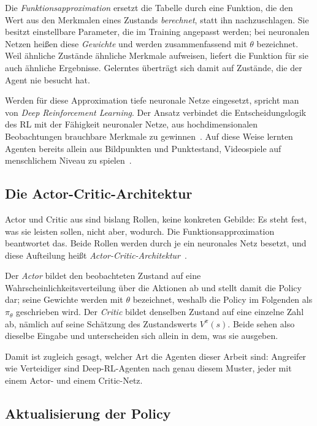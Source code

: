 Die \emph{Funktionsapproximation} ersetzt die Tabelle durch eine Funktion, die
den Wert aus den Merkmalen eines Zustands \emph{berechnet}, statt ihn
nachzuschlagen. Sie besitzt einstellbare Parameter, die im Training angepasst
werden; bei neuronalen Netzen heißen diese \emph{Gewichte} und werden
zusammenfassend mit $\theta$ bezeichnet. Weil ähnliche Zustände ähnliche
Merkmale aufweisen, liefert die Funktion für sie auch ähnliche Ergebnisse.
Gelerntes überträgt sich damit auf Zustände, die der Agent nie besucht hat.

Werden für diese Approximation tiefe neuronale Netze eingesetzt, spricht man von
\emph{Deep Reinforcement Learning}. Der Ansatz verbindet die Entscheidungslogik
des \ac{RL} mit der Fähigkeit neuronaler Netze, aus hochdimensionalen
Beobachtungen brauchbare Merkmale zu gewinnen~\cite[Teil~II]{suttonbarto2018}.
Auf diese Weise lernten Agenten bereits allein aus Bildpunkten und Punktestand,
Videospiele auf menschlichem Niveau zu spielen~\cite[S.~529]{mnih2015dqn}.

\subsection{Die Actor-Critic-Architektur}
\label{sec:ac-architektur}

Actor und Critic aus  sind bislang Rollen, keine
konkreten Gebilde: Es steht fest, was sie leisten sollen, nicht aber, wodurch.
Die Funktionsapproximation beantwortet das. Beide Rollen werden durch je ein
neuronales Netz besetzt, und diese Aufteilung heißt
\emph{Actor-Critic-Architektur}~\cite[Abschn.~13.5]{suttonbarto2018}.

Der \emph{Actor} bildet den beobachteten Zustand auf eine
Wahrscheinlichkeitsverteilung über die Aktionen ab und stellt damit die Policy
dar; seine Gewichte werden mit $\theta$ bezeichnet, weshalb die Policy im
Folgenden als $\pi_{\theta}$ geschrieben wird. Der \emph{Critic} bildet
denselben Zustand auf eine einzelne Zahl ab, nämlich auf seine Schätzung des
Zustandswerts $V^{\pi}(s)$. Beide sehen also dieselbe Eingabe und
unterscheiden sich allein in dem, was sie ausgeben.

Damit ist zugleich gesagt, welcher Art die Agenten dieser Arbeit sind:
Angreifer wie Verteidiger sind Deep-\ac{RL}-Agenten nach genau diesem Muster,
jeder mit einem Actor- und einem Critic-Netz.

\subsection{Aktualisierung der Policy}
\label{sec:policyupdate}

